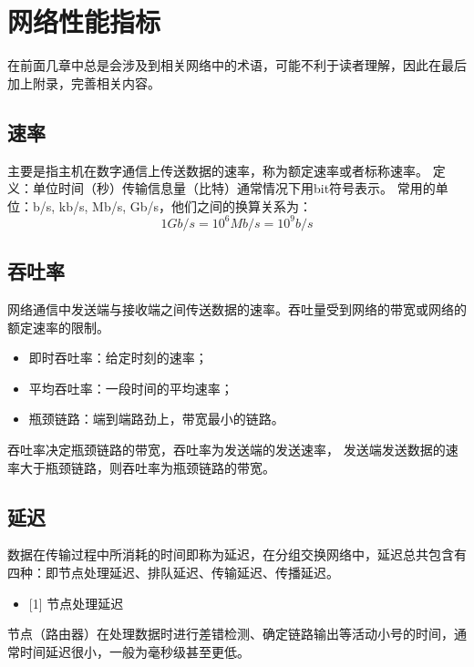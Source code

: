 \chapter{网络性能指标}
\label{网络性能指标}

在前面几章中总是会涉及到相关网络中的术语，可能不利于读者理解，因此在最后加上附录，完善相关内容。

\section{速率}
\label{速率}

主要是指主机在数字通信上传送数据的速率，称为额定速率或者标称速率。
定义：单位时间（秒）传输信息量（比特）通常情况下用bit符号表示。
常用的单位：b\slash s, kb\slash s, Mb\slash s, Gb\slash s，他们之间的换算关系为：
$$1Gb/s = 10^6 Mb/s = 10^9 b/s$$

\section{吞吐率}
\label{吞吐率}

网络通信中发送端与接收端之间传送数据的速率。吞吐量受到网络的带宽或网络的额定速率的限制。

\begin{itemize}
\item 即时吞吐率：给定时刻的速率；

\item 平均吞吐率：一段时间的平均速率；

\item 瓶颈链路：端到端路劲上，带宽最小的链路。

\end{itemize}

吞吐率决定瓶颈链路的带宽，吞吐率为发送端的发送速率， 发送端发送数据的速率大于瓶颈链路，则吞吐率为瓶颈链路的带宽。

\section{延迟}
\label{延迟}

数据在传输过程中所消耗的时间即称为延迟，在分组交换网络中，延迟总共包含有四种：即节点处理延迟、排队延迟、传输延迟、传播延迟。

\begin{itemize}
\item {[1]} 节点处理延迟

\end{itemize}

节点（路由器）在处理数据时进行差错检测、确定链路输出等活动小号的时间，通常时间延迟很小，一般为毫秒级甚至更低。


